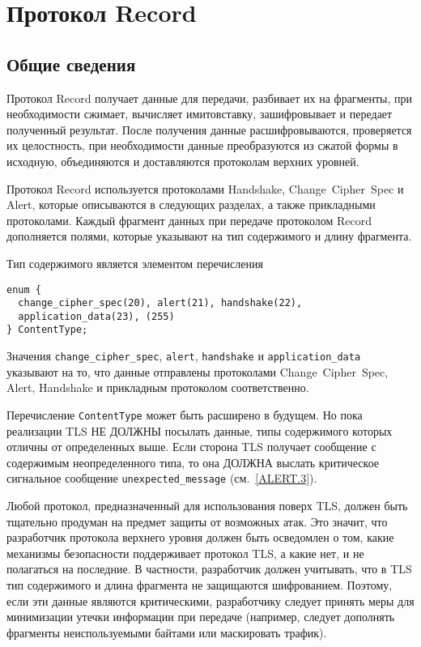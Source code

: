 \chapter{Протокол Record}\label{RECORD}

\section{Общие сведения}\label{RECORD.1}

Протокол Record получает данные для передачи, разбивает их на фрагменты,
при необходимости сжимает, вычисляет имитовставку, зашифровывает и передает
полученный результат. После получения данные расшифровываются, проверяется
их целостность, при необходимости данные преобразуются из сжатой формы в
исходную, объединяются и доставляются протоколам верхних уровней.

Протокол Record используется протоколами Handshake, Change~Cipher~Spec и
Alert, которые описываются в следующих разделах, а также прикладными
протоколами. Каждый фрагмент данных при передаче протоколом Record
дополняется полями, которые указывают на тип содержимого и длину фрагмента.

Тип содержимого является элементом перечисления
\begin{lstlisting}
enum {
  change_cipher_spec(20), alert(21), handshake(22),
  application_data(23), (255)
} ContentType;
\end{lstlisting}

Значения \lstinline{change_cipher_spec}, \lstinline{alert}, \lstinline{handshake}
и \lstinline{application_data} указывают на то, что данные отправлены
протоколами Change~Cipher~Spec, Alert, Handshake и прикладным
протоколом соответственно.

Перечисление \lstinline{ContentType} может быть расширено в будущем. Но пока 
реализации TLS НЕ ДОЛЖНЫ посылать данные, типы содержимого которых отличны 
от определенных выше. Если сторона TLS получает сообщение с содержимым 
неопределенного типа, то она ДОЛЖНА выслать критическое сигнальное 
сообщение \lstinline{unexpected_message} (см.~\ref{ALERT.3}). 

Любой протокол, предназначенный для использования поверх TLS, должен быть 
тщательно продуман на предмет защиты от возможных атак. Это значит, что 
разработчик протокола верхнего уровня должен быть осведомлен о том, какие 
механизмы безопасности поддерживает протокол TLS, а какие нет, и не 
полагаться на последние. В частности, разработчик должен учитывать, что в 
TLS тип содержимого и длина фрагмента не защищаются шифрованием. Поэтому, 
если эти данные являются критическими, разработчику следует принять меры 
для минимизации утечки информации при передаче (например, следует 
дополнять фрагменты неиспользуемыми байтами или маскировать трафик). 


